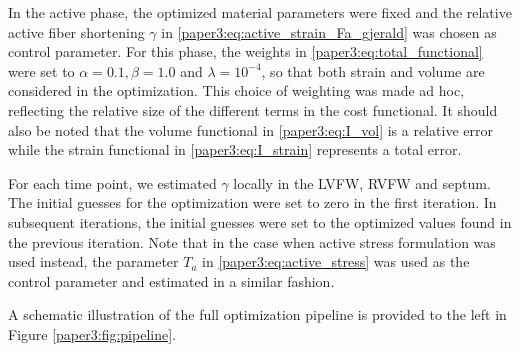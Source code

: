 In the active phase, the optimized material parameters were fixed and
the relative active fiber shortening $\gamma$ in
\eqref{paper3:eq:active_strain_Fa_gjerald} was chosen as control
parameter. For this phase, the weights in \eqref{paper3:eq:total_functional}
were set to $\alpha = 0.1,  \beta = 1.0$ and $\lambda = 10^{-4}$, so
that both strain and volume are considered in the optimization. This
choice of weighting was made ad hoc, reflecting the relative size of
the different terms in the cost functional. It should also be noted
that the volume functional in \eqref{paper3:eq:I_vol} is a relative error
while the strain functional in \eqref{paper3:eq:I_strain} represents a total
error. 

For each time point, we estimated $\gamma$ locally in the LVFW, RVFW
and septum. The initial guesses for the optimization were set to zero
in the first iteration. In subsequent iterations, the initial guesses
were set to the optimized values found in the previous iteration.
Note that in the case when active stress formulation was used instead,
the parameter $T_a$ in \eqref{paper3:eq:active_stress} was used as the
control parameter and estimated in a similar fashion. 

A schematic illustration of the full optimization pipeline is provided
to the left in Figure \ref{paper3:fig:pipeline}.

